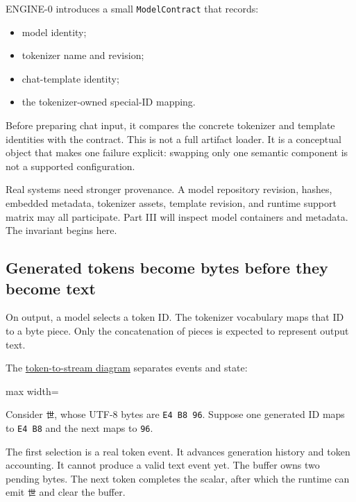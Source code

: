 \documentclass[
  10pt,
]{article}
\providecommand{\tightlist}{%
  \setlength{\itemsep}{0pt}\setlength{\parskip}{0pt}}
\begin{document}
ENGINE-0 introduces a small \texttt{ModelContract} that records:

\begin{itemize}
\tightlist
\item
  model identity;
\item
  tokenizer name and revision;
\item
  chat-template identity;
\item
  the tokenizer-owned special-ID mapping.
\end{itemize}

Before preparing chat input, it compares the concrete tokenizer and
template identities with the contract. This is not a full artifact
loader. It is a conceptual object that makes one failure explicit:
swapping only one semantic component is not a supported configuration.

Real systems need stronger provenance. A model repository revision,
hashes, embedded metadata, tokenizer assets, template revision, and
runtime support matrix may all participate. Part III will inspect model
containers and metadata. The invariant begins here.

\subsection{Generated tokens become bytes before they become
text}\label{generated-tokens-become-bytes-before-they-become-text}

On output, a model selects a token ID. The tokenizer vocabulary maps
that ID to a byte piece. Only the concatenation of pieces is expected to
represent output text.

The
\href{https://github.com/hermonai/inside-the-llm-engine/blob/astra-visual-rewrite/diagrams/tokenizer/token-to-byte-stream.txt}{token-to-stream
diagram} separates events and state:

\begin{center}\begin{adjustbox}{max width=\linewidth}\end{adjustbox}\end{center}

Consider \texttt{世}, whose UTF-8 bytes are \texttt{E4\ B8\ 96}. Suppose
one generated ID maps to \texttt{E4\ B8} and the next maps to
\texttt{96}.

The first selection is a real token event. It advances generation
history and token accounting. It cannot produce a valid text event yet.
The buffer owns two pending bytes. The next token completes the scalar,
after which the runtime can emit \texttt{世} and clear the buffer.
\end{document}
